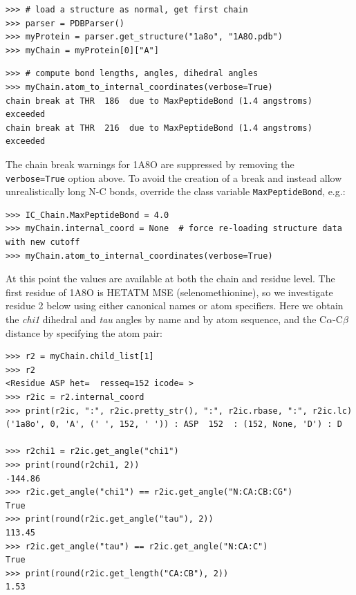 \begin{verbatim}
>>> # load a structure as normal, get first chain
>>> parser = PDBParser()
>>> myProtein = parser.get_structure("1a8o", "1A8O.pdb")
>>> myChain = myProtein[0]["A"]
\end{verbatim}

\begin{verbatim}
>>> # compute bond lengths, angles, dihedral angles
>>> myChain.atom_to_internal_coordinates(verbose=True)
chain break at THR  186  due to MaxPeptideBond (1.4 angstroms) exceeded
chain break at THR  216  due to MaxPeptideBond (1.4 angstroms) exceeded
\end{verbatim}

The chain break warnings for 1A8O are suppressed by removing the \texttt{verbose=True}
option above. To avoid the creation of a break and instead allow unrealistically long
N-C bonds, override the class variable \texttt{MaxPeptideBond}, e.g.:

\begin{verbatim}
>>> IC_Chain.MaxPeptideBond = 4.0
>>> myChain.internal_coord = None  # force re-loading structure data with new cutoff
>>> myChain.atom_to_internal_coordinates(verbose=True)
\end{verbatim}

At this point the values are available at both the chain and residue level.  The
first residue of 1A8O is HETATM MSE (selenomethionine), so we investigate residue 2
below using either canonical names or atom specifiers.  Here we obtain the \textit{chi1}
dihedral and \textit{tau} angles by name and by atom sequence, and the C$\alpha$-C$\beta$
distance by specifying the atom pair:

\begin{verbatim}
>>> r2 = myChain.child_list[1]
>>> r2
<Residue ASP het=  resseq=152 icode= >
>>> r2ic = r2.internal_coord
>>> print(r2ic, ":", r2ic.pretty_str(), ":", r2ic.rbase, ":", r2ic.lc)
('1a8o', 0, 'A', (' ', 152, ' ')) : ASP  152  : (152, None, 'D') : D

>>> r2chi1 = r2ic.get_angle("chi1")
>>> print(round(r2chi1, 2))
-144.86
>>> r2ic.get_angle("chi1") == r2ic.get_angle("N:CA:CB:CG")
True
>>> print(round(r2ic.get_angle("tau"), 2))
113.45
>>> r2ic.get_angle("tau") == r2ic.get_angle("N:CA:C")
True
>>> print(round(r2ic.get_length("CA:CB"), 2))
1.53
\end{verbatim}

